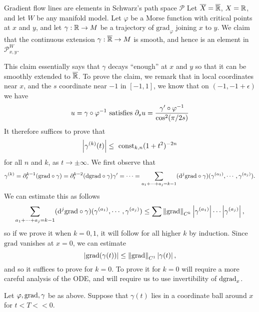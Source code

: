 \documentclass{amsart}
\begin{document}
\begin{clear}{Gradient flow lines are elements in Schwarz's path space
    $\mathscr{P}$}
  Let $\overline{X}=\overline{\mathbb{R}}$, $X=\mathbb{R}$, and let $W$ be any manifold model. Let $\varphi$ be a Morse function with critical points at $x$ and $y$, and let $\gamma:\mathbb{R}\to M$ be a trajectory of $\text{grad}_{\varphi}$ joining $x$ to $y$. We claim that the continuous extension $\gamma:\overline{\mathbb{R}}\to M$ is smooth, and hence is an element in $\mathscr{P}^{W}_{x,y}$.

  This claim essentially says that $\gamma$ decays ``enough'' at $x$ and $y$ so that it can be smoothly extended to $\overline{\mathbb{R}}$. To prove the claim, we remark that in local coordinates near $x$, and the $s$ coordinate near $-1$ in $[-1,1]$, we know that on $(-1,-1+\epsilon)$ we have
  \begin{equation*}
    u=\gamma\circ \varphi^{-1}\text{ satisfies }\partial_{s}u=\frac{\gamma'\circ \varphi^{-1}}{\cos^{2}(\pi/2 s)}
  \end{equation*}
  It therefore suffices to prove that
  \begin{equation*}
    \abs{\gamma^{(k)}(t)}\le\ \text{const}_{k,n}(1+t^{2})^{-2n}
  \end{equation*}
  for all $n$ and $k$, as $t\to \pm \infty$. We first observe that 
  \begin{equation*}
    \gamma^{(k)}=\partial_{t}^{k-1}(\text{grad} \circ \gamma)=\partial_{t}^{k-2}(\mathrm{d} \text{grad} \circ \gamma)\gamma'=\cdots=\sum_{a_{1}+\cdots+a_{j}=k-1} (\mathrm{d}^{j}\text{grad}\circ \gamma)(\gamma^{(a_{1})},\cdots,\gamma^{(a_{j})}).
  \end{equation*}
  We can estimate this as follows
  \begin{equation*}
    \sum_{a_{1}+\cdots+a_{j}=k-1} (\mathrm{d}^{j}\text{grad}\circ \gamma)(\gamma^{(a_{1})},\cdots,\gamma^{(a_{j})})\le \sum\left\lVert\text{grad}\right\rVert_{C^{k}}\left|\gamma^{(a_{1})}\right|\cdots \left|\gamma^{(a_{j})}\right|,
  \end{equation*}
  so if we prove it when $k=0,1$, it will follow for all higher $k$ by induction. Since $\text{grad}$ vanishes at $x=0$, we can estimate
  \begin{equation*}
    \left|\mathrm{grad}(\gamma(t))\right|\le \left\lVert\text{grad}\right\rVert_{C^{1}}\left|\gamma(t)\right|,
  \end{equation*}
  and so it suffices to prove for $k=0$. To prove it for $k=0$ will require a more careful analysis of the ODE, and will require us to use invertibility of $\mathrm{d}\mathrm{grad}_{x}$.

  \begin{xca}
    Let $\varphi,\mathrm{grad},\gamma$ be as above. Suppose that $\gamma(t)$ lies in a coordinate ball around $x$ for $t<T<<0$.


\end{xca}
\end{clear}
\end{document}
